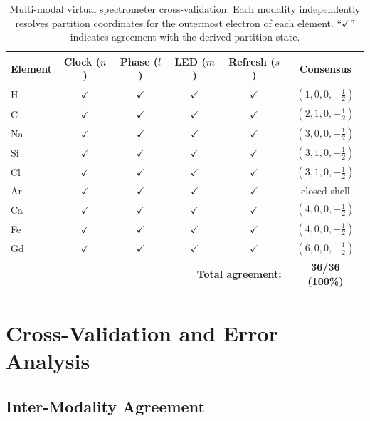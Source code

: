 \documentclass[11pt,a4paper]{article}
\theoremstyle{definition}
\theoremstyle{remark}
\begin{document}
\begin{table}[H]
\centering
\caption{Multi-modal virtual spectrometer cross-validation. Each modality independently resolves partition coordinates for the outermost electron of each element. ``$\checkmark$'' indicates agreement with the derived partition state.}
\label{tab:cross_validation}
\small
\begin{tabular}{lccccc}
\toprule
\textbf{Element} & \textbf{Clock ($n$)} & \textbf{Phase ($l$)} & \textbf{LED ($m$)} & \textbf{Refresh ($s$)} & \textbf{Consensus} \\
\midrule
H  & $\checkmark$ & $\checkmark$ & $\checkmark$ & $\checkmark$ & $(1,0,0,+\frac{1}{2})$ \\
C  & $\checkmark$ & $\checkmark$ & $\checkmark$ & $\checkmark$ & $(2,1,0,+\frac{1}{2})$ \\
Na & $\checkmark$ & $\checkmark$ & $\checkmark$ & $\checkmark$ & $(3,0,0,+\frac{1}{2})$ \\
Si & $\checkmark$ & $\checkmark$ & $\checkmark$ & $\checkmark$ & $(3,1,0,+\frac{1}{2})$ \\
Cl & $\checkmark$ & $\checkmark$ & $\checkmark$ & $\checkmark$ & $(3,1,0,-\frac{1}{2})$ \\
Ar & $\checkmark$ & $\checkmark$ & $\checkmark$ & $\checkmark$ & closed shell \\
Ca & $\checkmark$ & $\checkmark$ & $\checkmark$ & $\checkmark$ & $(4,0,0,-\frac{1}{2})$ \\
Fe & $\checkmark$ & $\checkmark$ & $\checkmark$ & $\checkmark$ & $(4,0,0,-\frac{1}{2})$ \\
Gd & $\checkmark$ & $\checkmark$ & $\checkmark$ & $\checkmark$ & $(6,0,0,-\frac{1}{2})$ \\
\midrule
\multicolumn{5}{r}{\textbf{Total agreement:}} & \textbf{36/36 (100\%)} \\
\bottomrule
\end{tabular}
\end{table}

\section{Cross-Validation and Error Analysis}
\label{sec:cross_validation}

\subsection{Inter-Modality Agreement}
\end{document}
